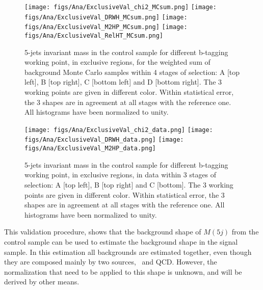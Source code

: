 \begin{figure}[!Hhtbp]
  \begin{center}
    \texttt{[image: figs/Ana/ExclusiveVal\_chi2\_MCsum.png]}
    \texttt{[image: figs/Ana/ExclusiveVal\_DRWH\_MCsum.png]}
    \texttt{[image: figs/Ana/ExclusiveVal\_M2HP\_MCsum.png]}
    \texttt{[image: figs/Ana/ExclusiveVal\_RelHT\_MCsum.png]}
    \caption{5-jets invariant mass in the control sample for different b-tagging working point, in exclusive regions, for the weighted sum of background Monte Carlo samples within 4 stages of selection: A [top left], B [top right], C [bottom left] and D [bottom right]. The 3 working points are given in different color. Within statistical error, the 3 shapes are in agreement at all stages with the reference one. All histograms have been normalized to unity.}
    \label{fig:StageExWPSum}
  \end{center}
\end{figure}

\begin{figure}[!Hhtbp]
  \begin{center}
    \texttt{[image: figs/Ana/ExclusiveVal\_chi2\_data.png]}
    \texttt{[image: figs/Ana/ExclusiveVal\_DRWH\_data.png]}
    \texttt{[image: figs/Ana/ExclusiveVal\_M2HP\_data.png]}
    \caption{5-jets invariant mass in the control sample for different b-tagging working point, in exclusive regions, in data within 3 stages of selection: A [top left], B [top right] and C [bottom]. The 3 working points are given in different color. Within statistical error, the 3 shapes are in agreement at all stages with the reference one. All histograms have been normalized to unity.}
    \label{fig:StageExWPData}
  \end{center}
\end{figure}

This validation procedure, shows that the background shape of $M(5j)$ from the control sample can be used to estimate the background shape in the signal sample. In this estimation all backgrounds are estimated together, even though they are composed mainly by two sources, \ttbar~and QCD. However, the normalization that need to be applied to this shape is unknown, and will be derived by other means. 

